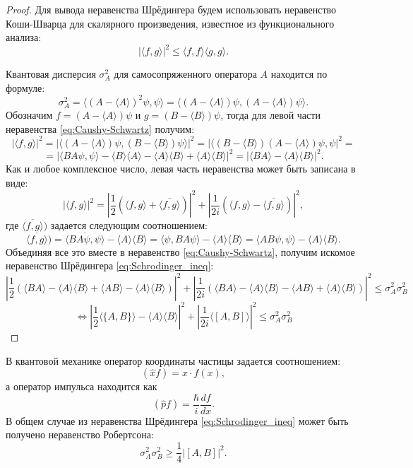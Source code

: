 \documentclass[%
master,         %
subf,           %
href,           %
,times         %
]{disser}
\numberwithin{equation}{section}
\numberwithin{figure}{section}
\begin{document}
\begin{proof}
Для вывода неравенства Шрёдингера будем использовать неравенство Коши-Шварца для скалярного произведения, известное из функционального анализа:
\begin{equation}
|\langle f, g\rangle |^2 \leq \langle f, f\rangle \langle g, g\rangle. \label{eq:Caushy-Schwartz}
\end{equation}

Квантовая дисперсия $\sigma^2_A$ для самосопряженного оператора $A$ находится по формуле:
\[
\sigma_A^2 = \langle (A - \langle A\rangle)^2\psi, \psi\rangle = \langle  (A - \langle A\rangle)\psi,  (A - \langle A\rangle)\psi\rangle.
\]
Обозначим $f = (A - \langle A\rangle)\psi$ и $g = (B - \langle B\rangle)\psi$, тогда для левой части неравенства \eqref{eq:Caushy-Schwartz} получим:
\[
|\langle f, g\rangle |^2 = |\langle (A - \langle A\rangle)\psi, (B - \langle B\rangle)\psi\rangle |^2 = |\langle (B - \langle B\rangle)(A - \langle A\rangle)\psi, \psi |^2 = 
\]
\[
= | \langle BA\psi, \psi\rangle - \langle B\rangle\langle A\rangle - \langle A\rangle \langle B\rangle + \langle A\rangle\langle B\rangle |^2 = | \langle BA\rangle - \langle A\rangle\langle B\rangle |^2.
\]
Как и любое комплексное число, левая часть неравенства может быть записана в виде:
\[
|\langle f, g\rangle |^2 = \left| \frac{1}{2}(\langle f, g\rangle + \overline{\langle f, g\rangle})\right|^2 + \left| \frac{1}{2i}(\langle f, g\rangle - \overline{\langle f, g\rangle})\right|^2, 
\]
где $\overline{\langle f, g\rangle})$ задается следующим соотношением:
\[
\overline{\langle f, g\rangle}) = \overline{\langle BA\psi, \psi\rangle} - \langle A\rangle\langle B\rangle = \langle\psi, BA\psi\rangle - \langle A\rangle\langle B\rangle = \langle AB\psi, \psi\rangle - \langle A\rangle\langle B\rangle.
\]
Объединяя все это вместе в неравенство \eqref{eq:Caushy-Schwartz}, получим искомое неравенство Шрёдингера \eqref{eq:Schrodinger_ineq}:
\[
\left| \frac{1}{2}(\langle BA\rangle - \langle A\rangle\langle B\rangle + \langle AB\rangle - \langle A\rangle\langle B\rangle)\right|^2 + \left| \frac{1}{2i}(\langle BA\rangle - \langle A\rangle\langle B\rangle - \langle AB\rangle + \langle A\rangle\langle B\rangle)\right|^2 \leq \sigma_A^2\sigma_B^2
\]
\[
\Leftrightarrow \left| \frac{1}{2}\langle\{A, B\}\rangle - \langle A\rangle\langle B\rangle \right|^2 + \left| \frac{1}{2i}\langle [A, B]\rangle\right|^2 \leq \sigma_A^2\sigma_B^2
\]
\end{proof}

В квантовой механике оператор координаты частицы задается соотношением:
\[
(\hat{x}f) = x\cdot f(x),
\]
а оператор импульса находится как
\[
(\hat{p}f) = \frac{\hbar}{i}\frac{df}{dx}.
\]
В общем случае из неравенства Шрёдингера  \eqref{eq:Schrodinger_ineq} может быть получено неравенство Робертсона:
\[
\sigma_A^2\sigma_B^2 \geq \frac{1}{4}|[A, B]|^2.
\]
\end{document}

